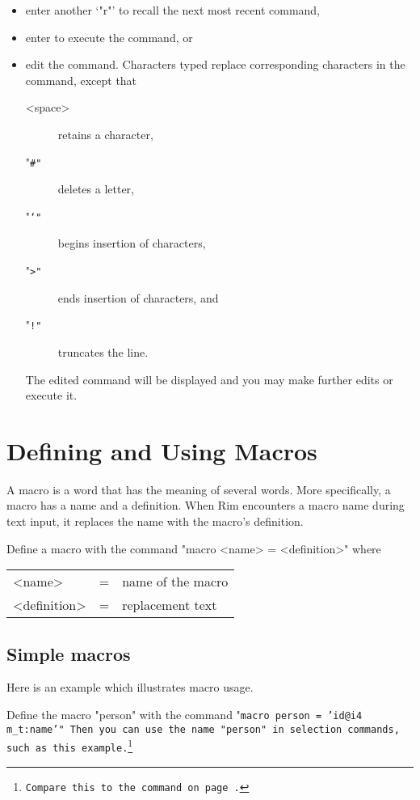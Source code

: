 \begin{itemize}
\item enter another `"r"' to recall the next most recent command,
\item enter  to execute the command, or
\item edit the command.  Characters typed replace corresponding
  characters in the command, except that
 
  \begin{description}
  \item[<space>] retains a character,
  \item["\tt \#"] deletes a letter,
  \item["\tt \char`\<"] begins insertion of characters,
  \item["\tt >"] ends insertion of characters, and
  \item["\tt !"] truncates the line.
  \end{description}
 
  The edited command will be displayed and you may make further
  edits or execute it.
 
\end{itemize}
 
%
%
\chapter{Defining and Using Macros}
\label{mac-chapter}
A macro is a word that has the meaning of several words.
More specifically, a macro has a name and a definition.
When Rim encounters a macro name during text input, it
replaces the name with the macro's definition.
 
Define a macro with the command
\<"macro <name> = <definition>"\>
where
\< \begin{tabular}{lcl}
   <name> &=& name of the macro\\
   <definition> &=& replacement text
   \end{tabular}\>
 
\section{Simple macros}
Here is an example which illustrates macro usage.
 
Define the macro "person" with the command
\<"\tt macro person = 'id@i4 m_t:name'"\>
Then you can use the name "person" in selection commands, such as
this example.\footnote{Compare this to the command on
page~\pageref{sel-dem1}.}
 
